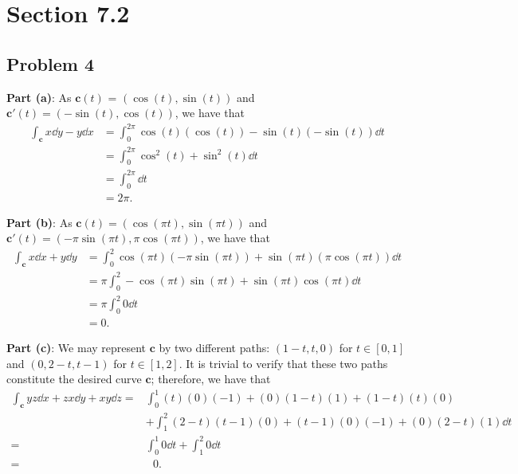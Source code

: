 \documentclass[11pt]{article}
\renewcommand{\vec}[1]{\mathbf{#1}}
\begin{document}

\section{Section 7.2}


\subsection*{Problem 4}

\textbf{Part (a)}: As $\vec{c}(t)$ = $(\cos(t), \sin(t))$ and  $\vec{c}'(t) = (-\sin(t), \cos(t))$, we have that
\begin{align*}
	\int_{\vec{c}} x \dd{y} - y \dd{x} &= \int_{0}^{2\pi} \cos(t) (\cos(t)) - \sin(t) (-\sin(t)) \dd{t}  \\
	&= \int_{0}^{2\pi} \cos^{2}(t) + \sin^{2}(t) \dd{t} \\
	&= \int_{0}^{2\pi} \dd{t} \\
	&= \boxed{2\pi}.
\end{align*}

\textbf{Part (b)}: As $\vec{c}(t) = (\cos(\pi t), \sin(\pi t))$ and $\vec{c}'(t) = (-\pi \sin(\pi t), \pi \cos(\pi t))$, we have that
\begin{align*}
	\int_{\vec{c}} x \dd{x} + y \dd{y} &= \int_{0}^{2} \cos(\pi t) (-\pi \sin(\pi t)) + \sin(\pi t) (\pi \cos(\pi t)) \dd{t} \\
	&= \pi \int_{0}^{2} -\cos(\pi t) \sin(\pi t) + \sin(\pi t) \cos(\pi t) \dd{t} \\
	&= \pi \int_{0}^{2} 0 \dd{t} \\
	&= \boxed{0}.
\end{align*}

\textbf{Part (c)}: We may represent $\vec{c}$ by two different paths: $(1 - t, t, 0)$ for $t \in [0, 1]$ and $(0, 2 - t, t - 1)$ for $t \in [1, 2]$. It is trivial to verify that these two paths constitute the desired curve $\vec{c}$; therefore, we have that
\begin{align*}
	\int_{\vec{c}} yz \dd{x} + zx \dd{y} + xy \dd{z} =& \int_{0}^{1} (t)(0)(-1) + (0)(1 - t)(1) + (1 - t)(t)(0) \\
	& + \int_{1}^{2} (2 - t)(t - 1)(0) + (t - 1)(0)(-1) + (0)(2 - t)(1) \dd{t} \\
	=& \int_{0}^{1} 0 \dd{t}  + \int_{1}^{2} 0 \dd{t} \\
	=& \text{ } \boxed{0}.
\end{align*}
\end{document}
